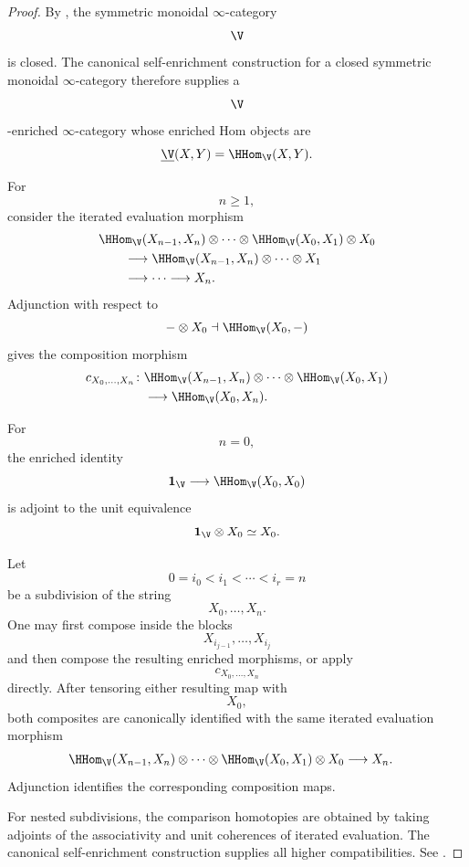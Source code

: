 \begin{proof}
By
,
the symmetric monoidal $\infty$-category
\[
    \V
\]
is closed. The canonical self-enrichment construction for a closed
symmetric monoidal $\infty$-category therefore supplies a
\[
    \V
\]
-enriched $\infty$-category whose enriched Hom objects are
\[
    \underline{\V}(X,Y)
    =
    \HHom_{\V}(X,Y).
\]

For
\[
    n\geq1,
\]
consider the iterated evaluation morphism
\[
\begin{aligned}
    &
    \HHom_{\V}(X_{n-1},X_n)
    \otimes
    \cdots
    \otimes
    \HHom_{\V}(X_0,X_1)
    \otimes
    X_0
    \\
    &\qquad\longrightarrow
    \HHom_{\V}(X_{n-1},X_n)
    \otimes
    \cdots
    \otimes
    X_1
    \\
    &\qquad\longrightarrow
    \cdots
    \longrightarrow
    X_n.
\end{aligned}
\]
Adjunction with respect to
\[
    -\otimes X_0
    \dashv
    \HHom_{\V}(X_0,-)
\]
gives the composition morphism
\[
\begin{aligned}
    c_{X_0,\ldots,X_n}
    \colon{}&
    \HHom_{\V}(X_{n-1},X_n)
    \otimes
    \cdots
    \otimes
    \HHom_{\V}(X_0,X_1)
    \\
    &\longrightarrow
    \HHom_{\V}(X_0,X_n).
\end{aligned}
\]

For
\[
    n=0,
\]
the enriched identity
\[
    \mathbf 1_{\V}
    \longrightarrow
    \HHom_{\V}(X_0,X_0)
\]
is adjoint to the unit equivalence
\[
    \mathbf 1_{\V}\otimes X_0
    \simeq
    X_0.
\]

Let
\[
    0=i_0<i_1<\cdots<i_r=n
\]
be a subdivision of the string
\[
    X_0,\ldots,X_n.
\]
One may first compose inside the blocks
\[
    X_{i_{j-1}},\ldots,X_{i_j}
\]
and then compose the resulting enriched morphisms, or apply
\[
    c_{X_0,\ldots,X_n}
\]
directly. After tensoring either resulting map with
\[
    X_0,
\]
both composites are canonically identified with the same iterated
evaluation morphism
\[
\begin{aligned}
    &
    \HHom_{\V}(X_{n-1},X_n)
    \otimes
    \cdots
    \otimes
    \HHom_{\V}(X_0,X_1)
    \otimes
    X_0
    \longrightarrow
    X_n.
\end{aligned}
\]
Adjunction identifies the corresponding composition maps.

For nested subdivisions, the comparison homotopies are obtained by taking
adjoints of the associativity and unit coherences of iterated evaluation.
The canonical self-enrichment construction supplies all higher
compatibilities. See
\cite{GepnerHaugsengEnrichedInfinityCategories,LurieHigherAlgebra}.
\end{proof}

